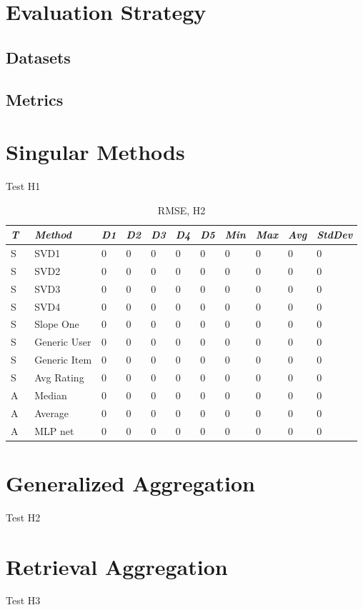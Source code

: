 \label{chap:results}

\section{Evaluation Strategy}
\subsection{Datasets}
\subsection{Metrics}

\section{Singular Methods}

Test H1

\begin{table}[t]
  \begin{tabular*}{\textwidth}{ l l l l l l l l l l l }
    \toprule
      \emph{T} & \emph{Method} & 
      \emph{D1} & \emph{D2} & \emph{D3} & \emph{D4} & \emph{D5} & 
      \emph{Min} & \emph{Max} & \emph{Avg} & \emph{StdDev}\\
    \midrule
    S & SVD1 & 0 & 0 & 0 & 0 & 0 & 0 & 0 & 0 & 0  \\
    S & SVD2 & 0 & 0 & 0 & 0 & 0 & 0 & 0 & 0 & 0  \\
    S & SVD3 & 0 & 0 & 0 & 0 & 0 & 0 & 0 & 0 & 0  \\
    S & SVD4 & 0 & 0 & 0 & 0 & 0 & 0 & 0 & 0 & 0  \\
    S & Slope One & 0 & 0 & 0 & 0 & 0 & 0 & 0 & 0 & 0  \\
    S & Generic User & 0 & 0 & 0 & 0 & 0 & 0 & 0 & 0 & 0  \\
    S & Generic Item & 0 & 0 & 0 & 0 & 0 & 0 & 0 & 0 & 0  \\
    S & Avg Rating & 0 & 0 & 0 & 0 & 0 & 0 & 0 & 0 & 0  \\
    \midrule
    A & Median  & 0 & 0 & 0 & 0 & 0 & 0 & 0 & 0 & 0  \\
    A & Average & 0 & 0 & 0 & 0 & 0 & 0 & 0 & 0 & 0  \\
    A & MLP net & 0 & 0 & 0 & 0 & 0 & 0 & 0 & 0 & 0  \\
    \bottomrule
  \end{tabular*}
  \caption[Results]{RMSE, H2}
  \label{table:results:h2}
\end{table}












\section{Generalized Aggregation}

Test H2


\section{Retrieval Aggregation}

Test H3




